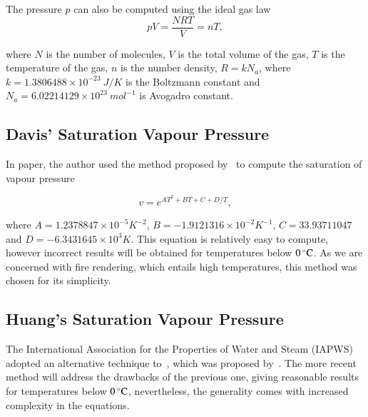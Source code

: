 The pressure $p$ can also be computed using the ideal gas law
\begin{equation}
\label{eq:ciddor_p}
pV=\frac{NRT}{V} = n T,
\end{equation}

where $N$ is the number of molecules, $V$ is the total volume of the gas, $T$ is the temperature of the gas, $n$ is the number density, $R = k N_a$, where $k = 1.3806488 \times 10^{-23}~J/K$ is the Boltzmann constant and $N_a = 6.02214129 \times 10^{23}~mol^{-1}$ is Avogadro constant.

\subsection{Davis' Saturation Vapour Pressure}
\label{subsec:davis_v}

In \cite{Ciddor:1996} paper, the author used the method proposed by~\cite{Davis:1992} to compute the saturation of vapour pressure

\begin{equation}
\label{eq:davis_v}
v = e^{AT^2 + BT + C + D/T},
\end{equation}

where $A = 1.2378847 \times 10^{-5} K^{-2}$, $B = -1.9121316 \times 10^{-2} K^{-1}$, $C = 33.93711047$ and $D = -6.3431645 \times 10^3 K$.
This equation is relatively easy to compute, however incorrect results will be obtained for temperatures below $0\,^{\circ}{\rm C}$.
As we are concerned with fire rendering, which entails high temperatures, this method was chosen for its simplicity.

\subsection{Huang's Saturation Vapour Pressure}
\label{subsec:huang_v}

The International Association for the Properties of Water and Steam (IAPWS) adopted an alternative technique to~\cite{Davis:1992}, which was proposed by~\cite{Huang:1998}.
The more recent method will address the drawbacks of the previous one, giving reasonable results for temperatures below $0\,^{\circ}{\rm C}$, nevertheless, the generality comes with increased complexity in the equations.

